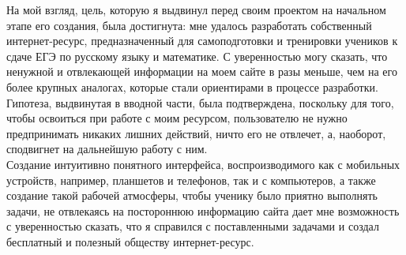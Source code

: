 \documentclass[a4paper, 12pt]{extarticle}
\begin{document}
На мой взгляд, цель, которую я выдвинул перед своим проектом на начальном этапе
его создания, была достигнута: мне удалось разработать собственный
интернет-ресурс, предназначенный для самоподготовки и тренировки учеников к
сдаче ЕГЭ по русскому языку и математике. С уверенностью могу сказать, что
ненужной и отвлекающей информации на моем сайте в разы меньше, чем на его более
крупных аналогах, которые стали ориентирами в процессе разработки.
\\

Гипотеза, выдвинутая в вводной части, была подтверждена, поскольку
для того, чтобы освоиться при работе с моим ресурсом, пользователю не нужно
предпринимать никаких лишних действий, ничто его не отвлечет, а, наоборот,
сподвигнет на дальнейшую работу с ним.
\\

Создание интуитивно понятного интерфейса, воспроизводимого как с мобильных
устройств, например, планшетов и телефонов, так и с компьютеров, а также
создание такой рабочей атмосферы, чтобы ученику было приятно выполнять задачи,
не отвлекаясь на постороннюю информацию сайта дает мне возможность с
уверенностью сказать, что я справился с поставленными задачами и создал
бесплатный и полезный обществу интернет-ресурс.
\newpage

{}

\end{document}
